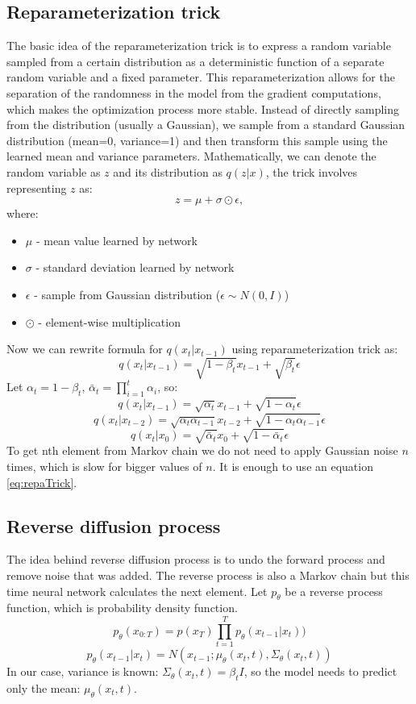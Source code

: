 \documentclass[11pt,a4paper]{report}
\begin{document}
\subsection{Reparameterization trick}
The basic idea of the reparameterization trick is to express a random variable sampled from a certain distribution as a deterministic function of a separate random variable and a fixed parameter. This reparameterization allows for the separation of the randomness in the model from the gradient computations, which makes the optimization process more stable. Instead of directly sampling from the distribution (usually a Gaussian), we sample from a standard Gaussian distribution (mean=0, variance=1) and then transform this sample using the learned mean and variance parameters. 
Mathematically, we can denote the random variable as $z$ and its distribution as $q(z|x)$, the trick involves representing $z$ as:
\[z=\mu + \sigma \odot \epsilon,\]
where:
\begin{itemize}
\item $\mu$ - mean value learned by network 
\item $\sigma$ - standard deviation learned by network 
\item $\epsilon$ - sample from Gaussian distribution ($\epsilon \sim N(0,I)$)
\item $\odot$ - element-wise multiplication
\end{itemize}
Now we can rewrite formula for $q(x_t|x_{t-1})$ using reparameterization trick as:
\[q(x_t|x_{t-1}) = \sqrt{1 - \beta_t}x_{t-1} + \sqrt{\beta_t}\epsilon\]
Let $\alpha_t = 1 - \beta_t$, $\bar{\alpha}_t = \prod_{i=1}^{t}{\alpha_i}$, so:
\[q(x_t|x_{t-1}) = \sqrt{\alpha_t}x_{t-1} + \sqrt{1-\alpha_{t}}\epsilon\]
\[q(x_t|x_{t-2}) = \sqrt{\alpha_t \alpha_{t-1}}x_{t-2} + \sqrt{1-\alpha_t \alpha_{t-1}}\epsilon\]
\begin{equation}
q(x_t|x_0) = \sqrt{\bar{\alpha}_t}x_0 + \sqrt{1-\bar{\alpha}_t}\epsilon
\label{eq:repaTrick}
\end{equation}
To get nth element from Markov chain we do not need to apply Gaussian noise $n$ times, which is slow for bigger values of $n$. It is enough to use an equation \ref{eq:repaTrick}. \cite{lw_diffusion}
\subsection{Reverse diffusion process}
The idea behind reverse diffusion process is to undo the forward process and remove noise that was added. The reverse process is  also a Markov chain but this time neural network calculates the next element. Let $p_\theta$ be a reverse process function, which is probability density function.
\[p_\theta(x_{0:T}) = p(x_T)\prod_{t=1}^{T}{p_\theta(x_{t-1}|x_t)})\]
\[p_\theta(x_{t-1}|x_t) = N(x_{t-1};\mu_\theta(x_t, t), \Sigma_\theta(x_t,t))\]
In our case, variance is known: $\Sigma_\theta(x_t,t)=\beta_tI$, so the model needs to predict only the mean: $\mu_\theta(x_t, t)$.
\end{document}
